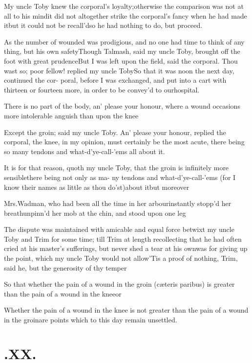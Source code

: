 \documentclass{article}
\begin{document}
My uncle Toby knew the corporal’s
loyalty;\tsk otherwise the comparison was not at all to his
mind\tsh it did not altogether strike the corporal’s
fancy when he had made it\tsh but it could not be
recall’d\tsh so he had nothing to do, but
proceed.

As the number of wounded was prodigious, and no one had time to
think of any thing, but his own safety\tsk Though Talmash,
said my uncle Toby, brought off the foot with great
prudence\tsh\break But I was left upon the field, said the
corporal. Thou wast so; poor fellow! replied my uncle
Toby\tsk So that it was noon the next day, continued the
cor- poral, before I was exchanged, and put into a cart
with thirteen or fourteen more, in order to be convey’d to
our\break hospital.

There is no part of the body, an’ please your honour,
where a wound occasions more intolerable anguish than upon the
knee\tsh

Except the groin; said my uncle Toby. An’ please
your honour, replied the corporal, the knee, in my opinion, must
certainly be the most acute, there being so many tendons and
what-d’ye-call-’ems all about it.

It is for that reason, quoth my uncle Toby, that the
groin is infinitely more sensible\tsh there being not only
as ma- ny tendons and what-d’ye-call-’ems (for I know
their names as little as thou do’st)\tsh about
it\tsh but moreover\break {}\tsh

Mrs.\@ Wadman, who had been all the time in her
arbour\tsk instantly stopp’d her\break
breath\tsk unpinn’d her mob at the chin, and stood upon one
leg\tsh

The dispute was maintained with ami\-cable and equal force betwixt
my uncle Toby and Trim for some time; till
Trim at length recollecting that he had often cried at his
master’s sufferings, but never shed a tear at his
own\tsk was for giving up the point, which my uncle Toby
would not allow\tsh ’Tis a proof of nothing,
Trim, said he, but the generosity of thy
temper\tsh{}

So that whether the pain of a wound in the groin (cæteris
paribus) is greater than the pain of a wound in the
knee\tsh or

Whether the pain of a wound in the knee is not greater than the
pain of a wound in the groin\tsh are points which to this
day remain unsettled.

\section{.\enspace XX.}
\end{document}
